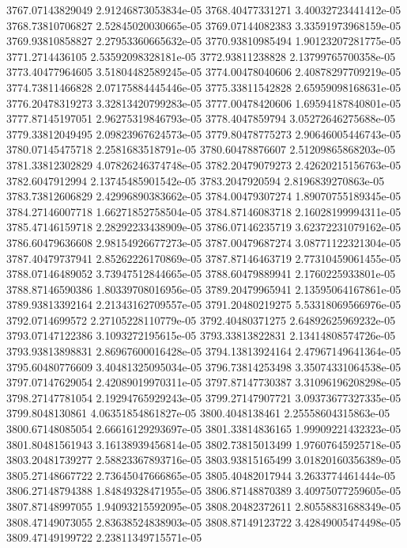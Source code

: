 {3767.07143829049 2.91246873053834e-05
3768.40477331271 3.40032723441412e-05
3768.73810706827 2.52845020030665e-05
3769.07144082383 3.33591973968159e-05
3769.93810858827 2.27953360665632e-05
3770.93810985494 1.90123207281775e-05
3771.2714436105 2.53592098328181e-05
3772.93811238828 2.13799765700358e-05
3773.40477964605 3.51804482589245e-05
3774.00478040606 2.40878297709219e-05
3774.73811466828 2.07175884445446e-05
3775.33811542828 2.65959098168631e-05
3776.20478319273 3.32813420799283e-05
3777.00478420606 1.69594187840801e-05
3777.87145197051 2.96275319846793e-05
3778.4047859794 3.05272646275688e-05
3779.33812049495 2.09823967624573e-05
3779.80478775273 2.90646005446743e-05
3780.07145475718 2.2581683518791e-05
3780.60478876607 2.51209865868203e-05
3781.33812302829 4.07826246374748e-05
3782.20479079273 2.42620215156763e-05
3782.6047912994 2.13745485901542e-05
3783.2047920594 2.8196839270863e-05
3783.73812606829 2.42996890383662e-05
3784.00479307274 1.89070755189345e-05
3784.27146007718 1.66271852758504e-05
3784.87146083718 2.16028199994311e-05
3785.47146159718 2.28292233438909e-05
3786.07146235719 3.62372231079162e-05
3786.60479636608 2.98154926677273e-05
3787.00479687274 3.08771122321304e-05
3787.40479737941 2.85262226170869e-05
3787.87146463719 2.77310459061455e-05
3788.07146489052 3.73947512844665e-05
3788.60479889941 2.1760225933801e-05
3788.87146590386 1.80339708016956e-05
3789.20479965941 2.13595064167861e-05
3789.93813392164 2.21343162709557e-05
3791.20480219275 5.53318069566976e-05
3792.0714699572 2.27105228110779e-05
3792.40480371275 2.64892625969232e-05
3793.07147122386 3.1093272195615e-05
3793.33813822831 2.13414808574726e-05
3793.93813898831 2.86967600016428e-05
3794.13813924164 2.47967149641364e-05
3795.60480776609 3.40481325095034e-05
3796.73814253498 3.35074331064538e-05
3797.07147629054 2.42089019970311e-05
3797.87147730387 3.31096196208298e-05
3798.27147781054 2.19294765929243e-05
3799.27147907721 3.09373677327335e-05
3799.8048130861 4.06351854861827e-05
3800.4048138461 2.25558604315863e-05
3800.67148085054 2.66616129293697e-05
3801.33814836165 1.99909221432323e-05
3801.80481561943 3.16138939456814e-05
3802.73815013499 1.97607645925718e-05
3803.20481739277 2.58823367893716e-05
3803.93815165499 3.01820160356389e-05
3805.27148667722 2.73645047666865e-05
3805.40482017944 3.2633774461444e-05
3806.27148794388 1.84849328471955e-05
3806.87148870389 3.40975077259605e-05
3807.87148997055 1.94093215592095e-05
3808.20482372611 2.80558831688349e-05
3808.47149073055 2.83638524838903e-05
3808.87149123722 3.42849005474498e-05
3809.47149199722 2.23811349715571e-05
}
